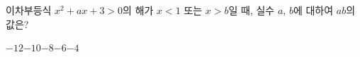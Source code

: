 \hspace*{2mm}\begin{minipage}[t]{\dimexpr\linewidth-2mm\relax}\vspace{0pt}
이차부등식 $x^2+ax+3>0$의 해가 $x<1$ 또는 $x>b$일 때, 실수 $a$, $b$에 대하여 $ab$의 값은? 
\begin{choices32}{$-12$}{$-10$}{$-8$}{$-6$}{$-4$}\end{choices32}\end{minipage}
